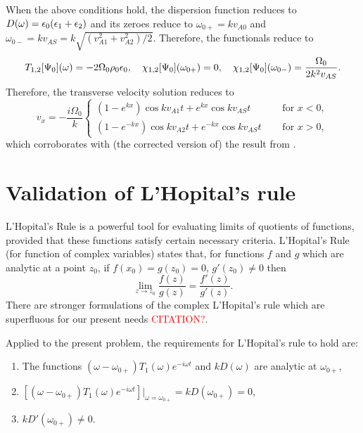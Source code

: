 \documentclass[12pt, draft]{../style-files/ociamthesis}
\begin{document}
When the above conditions hold, the dispersion function reduces to $D(\omega) = \epsilon_0(\epsilon_1 + \epsilon_2)$ and its zeroes reduce to $\omega_{0+} = kv_{A0}$ and $\omega_{0-} = kv_{AS} = k \sqrt{(v_{A1}^2 + v_{A2}^2) / 2}$. Therefore, the functionals reduce to
\begin{equation}
T_{1,2}[\Psi_0](\omega) = -2\Omega_0\rho_0 \epsilon_0,
\quad 
\chi_{1,2}[\Psi_0](\omega_{0+}) = 0,
\quad
\chi_{1,2}[\Psi_0](\omega_{0-}) = \frac{\Omega_0}{2k^2v_{AS}}.
\end{equation}
Therefore, the transverse velocity solution reduces to
\begin{equation}
v_x = -\frac{i\Omega_0}{k} 
\begin{cases}
(1 - e^{kx})\cos{kv_{A1}t} + e^{kx}\cos{kv_{AS}t} \quad &\text{ for } x < 0, \\
(1 - e^{-kx})\cos{kv_{A2}t} + e^{-kx}\cos{kv_{AS}t} \quad &\text{ for } x > 0,
\end{cases}
\end{equation}
which corroborates with (the corrected version of) the result from \cite{rae_etal81}.

\section{Validation of L'Hopital's rule} \label{app: l'hopital}
L'Hopital's Rule is a powerful tool for evaluating limits of quotients of functions, provided that these functions satisfy certain necessary criteria. L'Hopital's Rule (for function of complex variables) states that, for functions $f$ and $g$ which are analytic at a point $z_0$, if $f(x_0) = g(z_0) = 0$, $g'(z_0) \neq 0$ then
\begin{equation}
\lim_{z \to z_0}\frac{f(z)}{g(z)} = \frac{f'(z)}{g'(z)}.
\end{equation}
There are stronger formulations of the complex L'Hopital's rule which are superfluous for our present needs \textcolor{red}{CITATION?}.

Applied to the present problem, the requirements for L'Hopital's rule to hold are:
\begin{enumerate}
	\item The functions $(\omega - \omega_{0+}) T_1(\omega) e^{-i\omega t}$ and $kD(\omega)$ are analytic at $\omega_{0+}$,
	\item $[(\omega - \omega_{0+}) T_1(\omega) e^{-i\omega t}]|_{\omega = \omega_{0+}} = kD(\omega_{0+}) = 0$,
	\item $kD'(\omega_{0+}) \neq 0$.
\end{enumerate}
\end{document}

